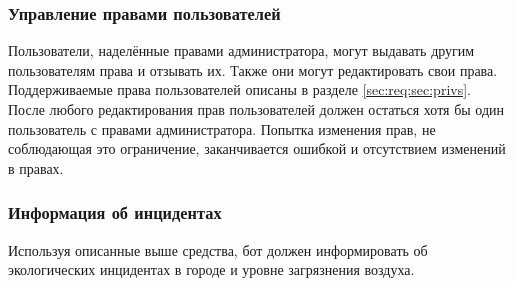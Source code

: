 \subsubsection{Управление правами пользователей}
    \label{seq:req:fn:roles}
    Пользователи, наделённые правами администратора, могут выдавать другим
    пользователям права и отзывать их. Также они могут редактировать свои права.
    Поддерживаемые права пользователей описаны в разделе \ref{sec:req:sec:privs}.
    После любого редактирования прав пользователей должен остаться хотя бы один
    пользователь с правами администратора. Попытка изменения прав, не соблюдающая
    это ограничение, заканчивается ошибкой и отсутствием изменений в правах.

\subsubsection{Информация об инцидентах}
    \label{sec:req:fn:incidents}
        Используя описанные выше средства, бот должен информировать об экологических инцидентах
        в городе и уровне загрязнения воздуха.
